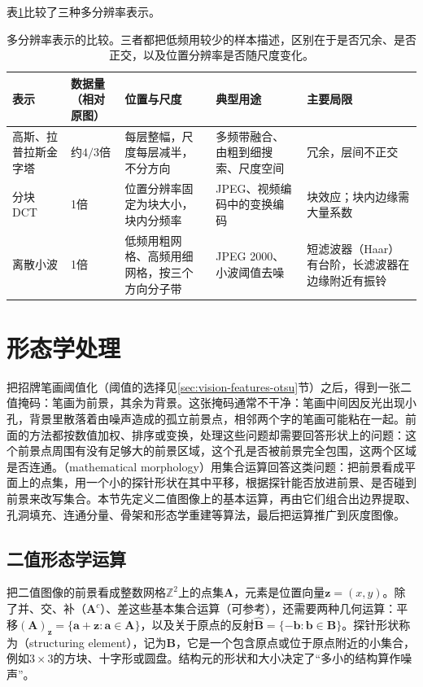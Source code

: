 表\ref{tab:vision-transforms-multiresolution-compare}比较了三种多分辨率表示。

\begin{table}[tbp]
  \centering
  \small
  \begin{tabularx}{\linewidth}{@{}p{18mm}XXXX@{}}
    \toprule
    表示 & 数据量（相对原图） & 位置与尺度 & 典型用途 & 主要局限\\
    \midrule
    高斯、拉普拉斯金字塔 & 约$4/3$倍 & 每层整幅，尺度每层减半，不分方向 & 多频带融合、由粗到细搜索、尺度空间 & 冗余，层间不正交\\
    分块DCT & 1倍 & 位置分辨率固定为块大小，块内分频率 & JPEG、视频编码中的变换编码 & 块效应；块内边缘需大量系数\\
    离散小波 & 1倍 & 低频用粗网格、高频用细网格，按三个方向分子带 & JPEG 2000、小波阈值去噪 & 短滤波器（Haar）有台阶，长滤波器在边缘附近有振铃\\
    \bottomrule
  \end{tabularx}
  \caption{多分辨率表示的比较。三者都把低频用较少的样本描述，区别在于是否冗余、是否正交，以及位置分辨率是否随尺度变化。}
  \label{tab:vision-transforms-multiresolution-compare}
\end{table}

\section{形态学处理}
\label{sec:vision-transforms-morphology}

把招牌笔画阈值化（阈值的选择见\ref{sec:vision-features-otsu}节）之后，得到一张二值掩码：笔画为前景，其余为背景。这张掩码通常不干净：笔画中间因反光出现小孔，背景里散落着由噪声造成的孤立前景点，相邻两个字的笔画可能粘在一起。前面的方法都按数值加权、排序或变换，处理这些问题却需要回答形状上的问题：这个前景点周围有没有足够大的前景区域，这个孔是否被前景完全包围，这两个区域是否连通。（mathematical morphology）用集合运算回答这类问题：把前景看成平面上的点集，用一个小的探针形状在其中平移，根据探针能否放进前景、是否碰到前景来改写集合。本节先定义二值图像上的基本运算，再由它们组合出边界提取、孔洞填充、连通分量、骨架和形态学重建等算法，最后把运算推广到灰度图像。

\subsection{二值形态学运算}
\label{sec:vision-transforms-binary-morphology}

把二值图像的前景看成整数网格$\mathbb{Z}^2$上的点集$\bm{A}$，元素是位置向量$\bm{z}=(x,y)$。除了并、交、补（$\bm{A}^{c}$）、差这些基本集合运算（可参考），还需要两种几何运算：平移$(\bm{A})_{\bm{z}}=\{\bm{a}+\bm{z}:\bm{a}\in\bm{A}\}$，以及关于原点的反射$\hat{\bm{B}}=\{-\bm{b}:\bm{b}\in\bm{B}\}$。探针形状称为（structuring element），记为$\bm{B}$，它是一个包含原点或位于原点附近的小集合，例如$3\times3$的方块、十字形或圆盘。结构元的形状和大小决定了“多小的结构算作噪声”。

